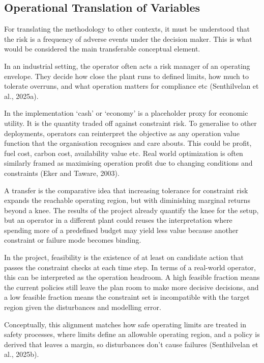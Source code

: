 \documentclass[11pt]{article}
\begin{document}
\subsection{Operational Translation of
Variables}\label{operational-translation-of-variables}

For translating the methodology to other contexts, it must be understood
that the risk is a frequency of adverse events under the decision maker.
This is what would be considered the main transferable conceptual
element.

In an industrial setting, the operator often acts a risk manager of an
operating envelope. They decide how close the plant runs to defined
limits, how much to tolerate overruns, and what operation matters for
compliance etc (Senthilvelan et al., 2025a).

In the implementation `cash' or `economy' is a placeholder proxy for
economic utility. It is the quantity traded off against constraint risk.
To generalise to other deployments, operators can reinterpret the
objective as any operation value function that the organisation
recognises and care abouts. This could be profit, fuel cost, carbon
cost, availability value etc. Real world optimization is often similarly
framed as maximising operation profit due to changing conditions and
constraints (Eker and Taware, 2003).

A transfer is the comparative idea that increasing tolerance for
constraint risk expands the reachable operating region, but with
diminishing marginal returns beyond a knee. The results of the project
already quantify the knee for the setup, but an operator in a different
plant could reuses the interpretation where spending more of a
predefined budget may yield less value because another constraint or
failure mode becomes binding.

In the project, feasibility is the existence of at least on candidate
action that passes the constraint checks at each time step. In terms of
a real-world operator, this can be interpreted as the operation
headroom. A high feasible fraction means the current policies still
leave the plan room to make more decisive decisions, and a low feasible
fraction means the constraint set is incompatible with the target region
given the disturbances and modelling error.

Conceptually, this alignment matches how safe operating limits are
treated in safety processes, where limits define an allowable operating
region, and a policy is derived that leaves a margin, so disturbances
don't cause failures (Senthilvelan et al., 2025b).
\end{document}
